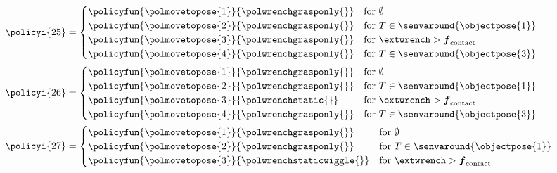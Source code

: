 \begin{align*}
&\policyi{25}=\begin{cases}
\policyfun{\polmovetopose{1}}{\polwrenchgrasponly{}} & \text{for } \emptyset \\
\policyfun{\polmovetopose{2}}{\polwrenchgrasponly{}} & \text{for } T \in \senvaround{\objectpose{1}} \\
\policyfun{\polmovetopose{3}}{\polwrenchgrasponly{}} & \text{for } \extwrench > \boldsymbol{f}_\text{contact} \\
\policyfun{\polmovetopose{4}}{\polwrenchgrasponly{}} & \text{for } T \in \senvaround{\objectpose{3}}
\end{cases}\\
&\policyi{26}=\begin{cases}
\policyfun{\polmovetopose{1}}{\polwrenchgrasponly{}} & \text{for } \emptyset \\
\policyfun{\polmovetopose{2}}{\polwrenchgrasponly{}} & \text{for } T \in \senvaround{\objectpose{1}} \\
\policyfun{\polmovetopose{3}}{\polwrenchstatic{}} & \text{for } \extwrench > \boldsymbol{f}_\text{contact} \\
\policyfun{\polmovetopose{4}}{\polwrenchgrasponly{}} & \text{for } T \in \senvaround{\objectpose{3}}
\end{cases}\\
&\policyi{27}=\begin{cases}
\policyfun{\polmovetopose{1}}{\polwrenchgrasponly{}} & \text{for } \emptyset \\
\policyfun{\polmovetopose{2}}{\polwrenchgrasponly{}} & \text{for } T \in \senvaround{\objectpose{1}} \\
\policyfun{\polmovetopose{3}}{\polwrenchstaticwiggle{}} & \text{for } \extwrench > \boldsymbol{f}_\text{contact}
\end{cases}
\end{align*}

